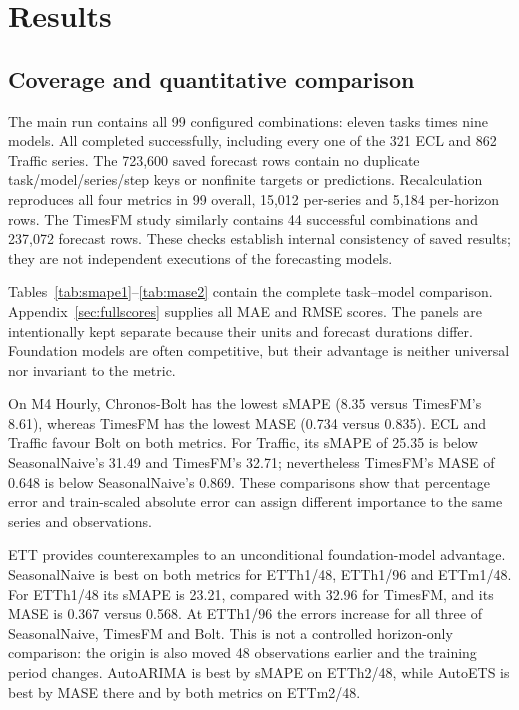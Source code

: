 \clearpage
\section{Results}\label{sec:results}

\subsection{Coverage and quantitative comparison}
The main run contains all 99 configured combinations: eleven tasks times nine models. All completed successfully, including every one of the 321 ECL and 862 Traffic series. The 723,600 saved forecast rows contain no duplicate task/model/series/step keys or nonfinite targets or predictions. Recalculation reproduces all four metrics in 99 overall, 15,012 per-series and 5,184 per-horizon rows. The TimesFM study similarly contains 44 successful combinations and 237,072 forecast rows. These checks establish internal consistency of saved results; they are not independent executions of the forecasting models.

Tables~\ref{tab:smape1}--\ref{tab:mase2} contain the complete task--model comparison. Appendix~\ref{sec:fullscores} supplies all MAE and RMSE scores. The panels are intentionally kept separate because their units and forecast durations differ. Foundation models are often competitive, but their advantage is neither universal nor invariant to the metric.






On M4 Hourly, Chronos-Bolt has the lowest sMAPE (8.35 versus TimesFM's 8.61), whereas TimesFM has the lowest MASE (0.734 versus 0.835). ECL and Traffic favour Bolt on both metrics. For Traffic, its sMAPE of 25.35 is below SeasonalNaive's 31.49 and TimesFM's 32.71; nevertheless TimesFM's MASE of 0.648 is below SeasonalNaive's 0.869. These comparisons show that percentage error and train-scaled absolute error can assign different importance to the same series and observations.

ETT provides counterexamples to an unconditional foundation-model advantage. SeasonalNaive is best on both metrics for ETTh1/48, ETTh1/96 and ETTm1/48. For ETTh1/48 its sMAPE is 23.21, compared with 32.96 for TimesFM, and its MASE is 0.367 versus 0.568. At ETTh1/96 the errors increase for all three of SeasonalNaive, TimesFM and Bolt. This is not a controlled horizon-only comparison: the origin is also moved 48 observations earlier and the training period changes. AutoARIMA is best by sMAPE on ETTh2/48, while AutoETS is best by MASE there and by both metrics on ETTm2/48.

